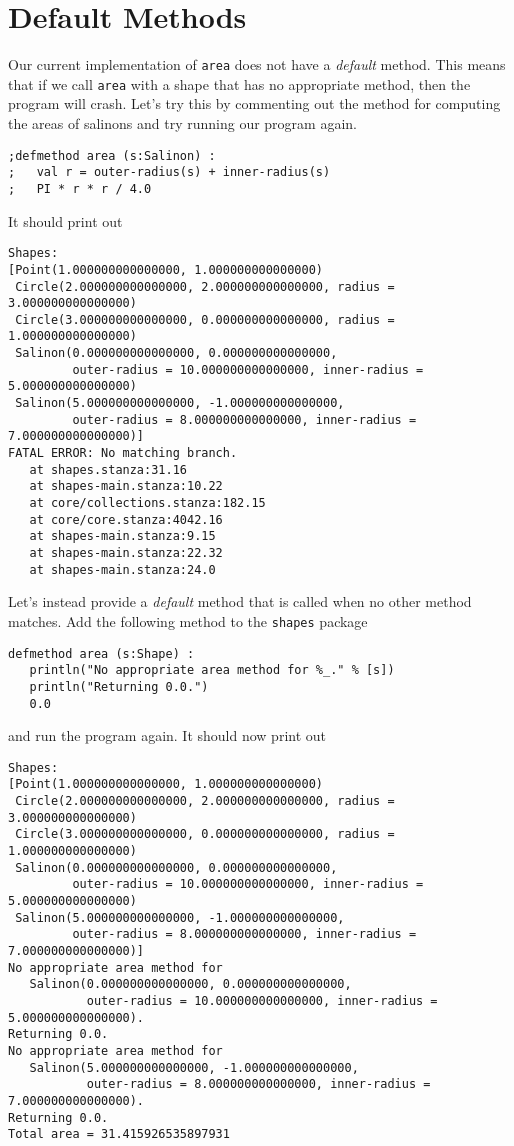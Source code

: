 \documentclass[10pt,oneside]{book}
\begin{document}
\section{Default Methods}
Our current implementation of \texttt{\frenchspacing area} does not have a {\em default} method. This means that if we call \texttt{\frenchspacing area} with a shape that has no appropriate method, then the program will crash. Let's try this by commenting out the method for computing the areas of salinons and try running our program again.
\begin{lstlisting}
;defmethod area (s:Salinon) :
;   val r = outer-radius(s) + inner-radius(s)
;   PI * r * r / 4.0
\end{lstlisting}
It should print out
\begin{lstlisting}
Shapes:
[Point(1.000000000000000, 1.000000000000000)
 Circle(2.000000000000000, 2.000000000000000, radius = 3.000000000000000)
 Circle(3.000000000000000, 0.000000000000000, radius = 1.000000000000000)
 Salinon(0.000000000000000, 0.000000000000000,
         outer-radius = 10.000000000000000, inner-radius = 5.000000000000000)
 Salinon(5.000000000000000, -1.000000000000000,
         outer-radius = 8.000000000000000, inner-radius = 7.000000000000000)]
FATAL ERROR: No matching branch.
   at shapes.stanza:31.16
   at shapes-main.stanza:10.22
   at core/collections.stanza:182.15
   at core/core.stanza:4042.16
   at shapes-main.stanza:9.15
   at shapes-main.stanza:22.32
   at shapes-main.stanza:24.0
\end{lstlisting}

Let's instead provide a {\em default} method that is called when no other method matches. Add the following method to the \texttt{\frenchspacing shapes} package
\begin{lstlisting}
defmethod area (s:Shape) :
   println("No appropriate area method for %_." % [s])
   println("Returning 0.0.")
   0.0
\end{lstlisting}
and run the program again. It should now print out
\begin{lstlisting}
Shapes:
[Point(1.000000000000000, 1.000000000000000)
 Circle(2.000000000000000, 2.000000000000000, radius = 3.000000000000000)
 Circle(3.000000000000000, 0.000000000000000, radius = 1.000000000000000)
 Salinon(0.000000000000000, 0.000000000000000,
         outer-radius = 10.000000000000000, inner-radius = 5.000000000000000)
 Salinon(5.000000000000000, -1.000000000000000,
         outer-radius = 8.000000000000000, inner-radius = 7.000000000000000)]
No appropriate area method for
   Salinon(0.000000000000000, 0.000000000000000,
           outer-radius = 10.000000000000000, inner-radius = 5.000000000000000).
Returning 0.0.
No appropriate area method for
   Salinon(5.000000000000000, -1.000000000000000,
           outer-radius = 8.000000000000000, inner-radius = 7.000000000000000).
Returning 0.0.
Total area = 31.415926535897931
\end{lstlisting}
\end{document}
